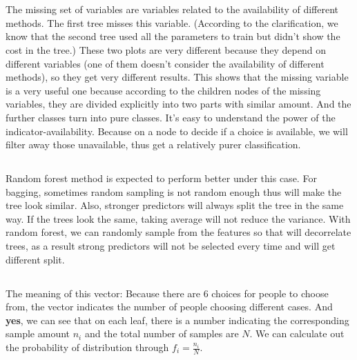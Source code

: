 \documentclass[11pt]{article}
\begin{document}
\section{}
\subsection{}
The missing set of variables are variables related to the availability of different methods. The first tree misses this variable. (According to the clarification, we know that the second tree used all the parameters to train but didn’t show the cost in the tree.) These two plots are very different because they depend on different variables (one of them doesn’t consider the availability of different methods), so they get very different results. This shows that the missing variable is a very useful one because according to the children nodes of the missing variables, they are divided explicitly into two parts with similar amount. And the further classes turn into pure classes. It’s easy to understand the power of the indicator-availability. Because on a node to decide if a choice is available, we will filter away those unavailable, thus get a relatively purer classification.
\subsection{}
Random forest method is expected to perform better under this case. For bagging, sometimes random sampling is not random enough thus will make the tree look similar. Also, stronger predictors will always split the tree in the same way. If the trees look the same, taking average will not reduce the variance. With random forest, we can randomly sample from the features so that will decorrelate trees, as a result strong predictors will not be selected every time and will get different split. 
\subsection{}
The meaning of this vector: Because there are 6 choices for people to choose from, the vector indicates the number of people choosing different cases. And \textbf{yes}, we can see that on each leaf, there is a number indicating the corresponding sample amount $n_i$ and the total number of samples are $N$. We can calculate out the probability of distribution through $f_i=\frac{n_i}{N}$.
\newpage
\end{document}
